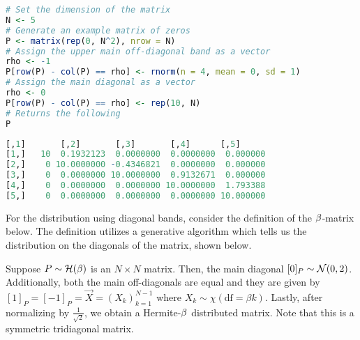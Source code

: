 \begin{lstlisting}[language=R]
# Set the dimension of the matrix
N <- 5
# Generate an example matrix of zeros
P <- matrix(rep(0, N^2), nrow = N)
# Assign the upper main off-diagonal band as a vector
rho <- -1
P[row(P) - col(P) == rho] <- rnorm(n = 4, mean = 0, sd = 1)
# Assign the main diagonal as a vector
rho <- 0
P[row(P) - col(P) == rho] <- rep(10, N)
# Returns the following
P
\end{lstlisting}
\newpage
\begin{lstlisting}[language=R]
     [,1]       [,2]       [,3]       [,4]      [,5]
[1,]   10  0.1932123  0.0000000  0.0000000  0.000000
[2,]    0 10.0000000 -0.4346821  0.0000000  0.000000
[3,]    0  0.0000000 10.0000000  0.9132671  0.000000
[4,]    0  0.0000000  0.0000000 10.0000000  1.793388
[5,]    0  0.0000000  0.0000000  0.0000000 10.000000
\end{lstlisting}


%
%

For the distribution using diagonal bands, consider the definition of the $\beta$-matrix below.
The definition utilizes a generative algorithm which tells us the distribution on the diagonals of the matrix, shown below.

\ALGbeta


\begin{definition}
Suppose $P \sim \mathcal{H}(\beta)$ is an $N \times N$ matrix. Then, the main diagonal $[0]_P \sim \mathcal{N}(0,2)$.
Additionally, both the main off-diagonals are equal and they are given by $[1]_{P} = [-1]_{P} = \vec{X} = (X_k)_{k=1}^{N-1}$ where $X_k \sim \chi(\text{df} = \beta k)$.
Lastly, after normalizing by $\frac{1}{\sqrt{2}}$, we obtain a Hermite-$\beta$ distributed matrix. Note that this is a symmetric tridiagonal matrix.
\end{definition}


